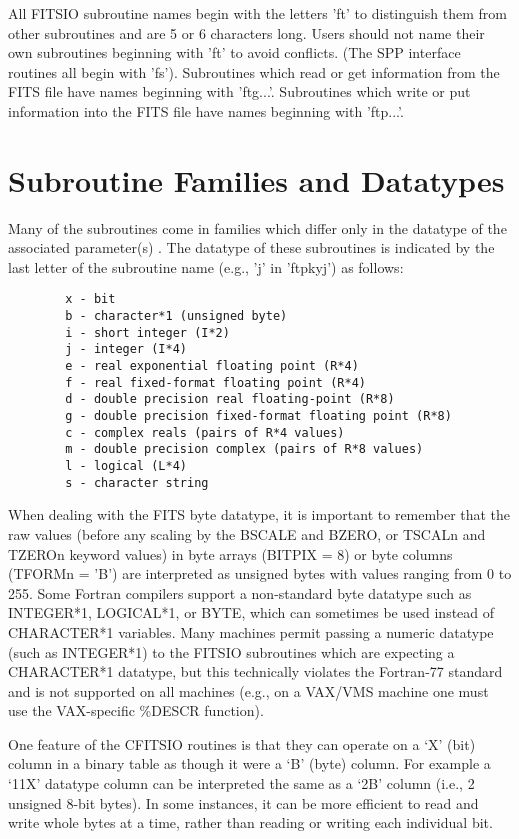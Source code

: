 \documentclass[11pt]{book}
\begin{document}
All FITSIO subroutine names begin with the letters 'ft' to distinguish
them from other subroutines and are 5 or 6 characters long. Users should
not name their own subroutines beginning with 'ft' to avoid conflicts.
(The SPP interface routines all begin with 'fs'). Subroutines which read
or get information from the FITS file have names beginning with
'ftg...'. Subroutines which write or put information into the FITS file
have names beginning with 'ftp...'.


\section{Subroutine Families and Datatypes}

Many of the subroutines come in families which differ only in the
datatype of the associated parameter(s) .  The datatype of these
subroutines is indicated by the last letter of the subroutine name
(e.g., 'j' in 'ftpkyj') as follows:

\begin{verbatim}
        x - bit
        b - character*1 (unsigned byte)
        i - short integer (I*2)
        j - integer (I*4)
        e - real exponential floating point (R*4)
        f - real fixed-format floating point (R*4)
        d - double precision real floating-point (R*8)
        g - double precision fixed-format floating point (R*8)
        c - complex reals (pairs of R*4 values)
        m - double precision complex (pairs of R*8 values)
        l - logical (L*4)
        s - character string
\end{verbatim}

When dealing with the FITS byte datatype, it is important to remember
that the raw values (before any scaling by the BSCALE and BZERO, or
TSCALn and TZEROn keyword values) in byte arrays (BITPIX = 8) or byte
columns (TFORMn = 'B') are interpreted as unsigned bytes with values
ranging from 0 to 255. Some Fortran compilers support a non-standard
byte datatype such as INTEGER*1, LOGICAL*1, or BYTE, which can sometimes
be used instead of CHARACTER*1 variables. Many machines permit passing a
numeric datatype (such as INTEGER*1) to the FITSIO subroutines which are
expecting a CHARACTER*1 datatype, but this technically violates the
Fortran-77 standard and is not supported on all machines (e.g., on a VAX/VMS
machine one must use the VAX-specific \%DESCR function).

One feature of the CFITSIO routines is that they can operate on a `X'
(bit) column in a binary table as though it were a `B' (byte) column.
For example a `11X' datatype column can be interpreted the same as a
`2B' column (i.e., 2 unsigned 8-bit bytes).  In some instances, it can
be more efficient to read and write whole bytes at a time, rather than
reading or writing each individual bit.
\end{document}
